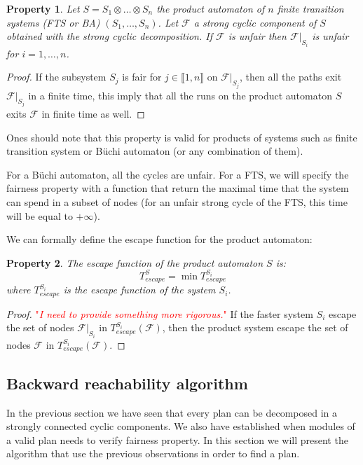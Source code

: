 \documentclass{article}
\newcommand\comment[1]{\textcolor{red}{"\textit{#1}"}}
\newtheorem{property}{Property}
\theoremstyle{named}
\newcommand{\propsymbol}{\( \blacklozenge \)}
\newenvironment{prop}[0]
    {\begin{samepage}
    \begin{property}
    \renewcommand{\qedsymbol}{\propsymbol}\pushQED{\qed}
    }
    {
    \popQED %
    \end{property} 
    \end{samepage}
    }
\newcommand{\buchi}[0]{B\"uchi}
\begin{document}
\begin{prop}
Let $S = S_1 \otimes \dots \otimes S_n$ the product automaton of $n$ finite transition systems (FTS or BA) $(S_1,\dots,S_n)$.
Let $\mathcal{F}$ a strong cyclic component of $S$ obtained with the strong cyclic decomposition.
If $\mathcal{F}$ is unfair then $\mathcal{F}|_{S_i}$ is unfair for $i = 1,\dots,n$.
\end{prop}

\begin{proof}
If the subsystem $S_j$ is fair for $j \in \llbracket 1,n \rrbracket$ on $\mathcal{F}|_{S_j}$, then all the paths exit $\mathcal{F}|_{S_j}$ in a finite time, this imply that all the runs on the product automaton $S$ exits $\mathcal{F}$ in finite time as well.
\end{proof}

Ones should note that this property is valid for products of systems such as finite transition system or \buchi{} automaton (or any combination of them).

For a \buchi{} automaton, all the cycles are unfair.
For a FTS, we will specify the fairness property with a function that return the maximal time that the system can spend in a subset of nodes
(for an unfair strong cycle of the FTS, this time will be equal to $+\infty$).

We can formally define the escape function for the product automaton:
\begin{property}
The escape function of the product automaton $S$ is:
$$T_{escape}^S = \min{T_{escape}^{S_i}}$$
where $T_{escape}^{S_i}$ is the escape function of the system $S_i$.
\end{property}

\begin{proof}
\comment{I need to provide something more rigorous.}
If the faster system $S_i$ escape the set of nodes $\mathcal{F}|_{S_i}$ in $T^{S_i}_{escape}(\mathcal{F})$, then the product system escape the set of nodes $\mathcal{F}$ in $T^{S_i}_{escape}(\mathcal{F})$.
\end{proof}

\subsection{Backward reachability algorithm}
In the previous section we have seen that every plan can be decomposed in a strongly connected cyclic components.
We also have established when modules of a valid plan needs to verify fairness property.
In this section we will present the algorithm that use the previous observations in order to find a plan.
\end{document}
